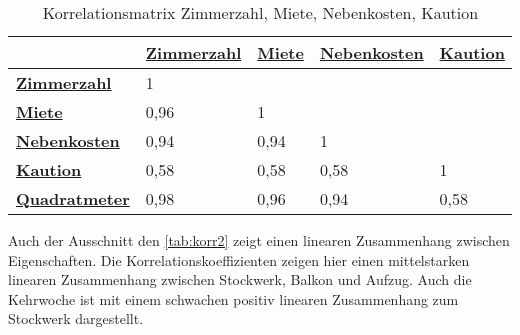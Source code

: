 \useunder{\uline}{\ul}{}
\begin{table}[h]
    \begin{center}
        \begin{tabular}{|l|l|l|l|l|}
            \hline
            {\ul \textbf{}}             & {\ul \textbf{Zimmerzahl}} & {\ul \textbf{Miete}} & {\ul \textbf{Nebenkosten}} & {\ul \textbf{Kaution}} \\ \hline
            {\ul \textbf{Zimmerzahl}}   & 1                         &                      &                            &                        \\ \hline
            {\ul \textbf{Miete}}        & 0,96                      & 1                    &                            &                        \\ \hline
            {\ul \textbf{Nebenkosten}}  & 0,94                      & 0,94                 & 1                          &                        \\ \hline
            {\ul \textbf{Kaution}}      & 0,58                      & 0,58                 & 0,58                       & 1                      \\ \hline
            {\ul \textbf{Quadratmeter}} & 0,98                      & 0,96                 & 0,94                       & 0,58                   \\ \hline
        \end{tabular}
        \caption{Korrelationsmatrix Zimmerzahl, Miete, Nebenkosten, Kaution}
        \label{tab:korr1}
    \end{center}
\end{table}

Auch der Ausschnitt den \autoref{tab:korr2} zeigt einen linearen Zusammenhang zwischen Eigenschaften. Die Korrelationskoeffizienten 
zeigen hier einen mittelstarken linearen Zusammenhang zwischen Stockwerk, Balkon und Aufzug. 
Auch die Kehrwoche ist mit einem schwachen positiv linearen Zusammenhang zum Stockwerk dargestellt. 


